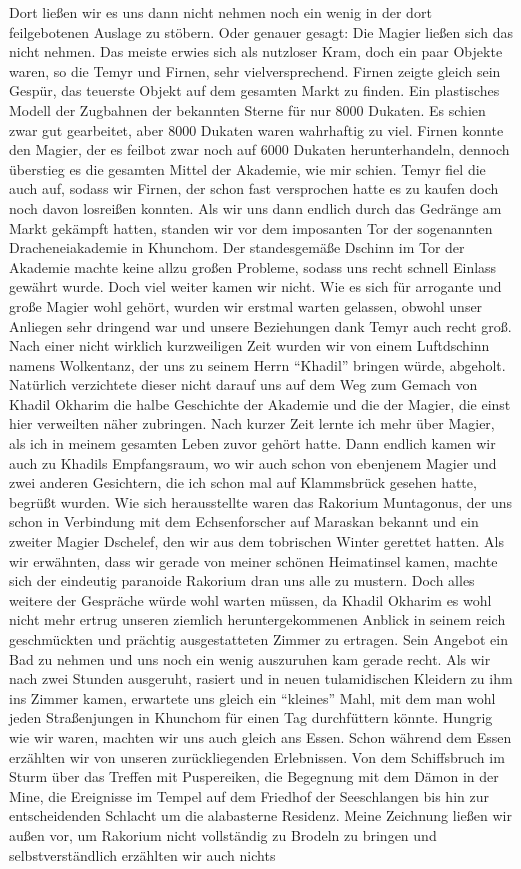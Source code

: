 Dort ließen wir es uns dann nicht nehmen noch ein wenig in der dort feilgebotenen Auslage zu stöbern. Oder genauer gesagt: Die Magier ließen sich das nicht nehmen. Das meiste erwies sich als nutzloser Kram, doch ein paar Objekte waren, so die Temyr und Firnen, sehr vielversprechend. Firnen zeigte gleich sein Gespür, das teuerste Objekt auf dem gesamten Markt zu finden. Ein plastisches Modell der Zugbahnen der bekannten Sterne für nur 8000 Dukaten. Es schien zwar gut gearbeitet, aber 8000 Dukaten waren wahrhaftig zu viel. Firnen konnte den Magier, der es feilbot zwar noch auf 6000 Dukaten herunterhandeln, dennoch überstieg es die gesamten Mittel der Akademie, wie mir schien. Temyr fiel die auch auf, sodass wir Firnen, der schon fast versprochen hatte es zu kaufen doch noch davon losreißen konnten. Als wir uns dann endlich durch das Gedränge am Markt gekämpft hatten, standen wir vor dem imposanten Tor der sogenannten Dracheneiakademie in Khunchom. Der standesgemäße Dschinn im Tor der Akademie machte keine allzu großen Probleme, sodass uns recht schnell Einlass gewährt wurde. Doch viel weiter kamen wir nicht. Wie es sich für arrogante und große Magier wohl gehört, wurden wir erstmal warten gelassen, obwohl unser Anliegen sehr dringend war und unsere Beziehungen dank Temyr auch recht groß. Nach einer nicht wirklich kurzweiligen Zeit wurden wir von einem Luftdschinn namens Wolkentanz, der uns zu seinem Herrn ``Khadil'' bringen würde, abgeholt. Natürlich verzichtete dieser nicht darauf uns auf dem Weg zum Gemach von Khadil Okharim die halbe Geschichte der Akademie und die der Magier, die einst hier verweilten näher zubringen. Nach kurzer Zeit lernte ich mehr über Magier, als ich in meinem gesamten Leben zuvor gehört hatte. Dann endlich kamen wir auch zu Khadils Empfangsraum, wo wir auch schon von ebenjenem Magier und zwei anderen Gesichtern, die ich schon mal auf Klammsbrück gesehen hatte, begrüßt wurden. Wie sich herausstellte waren das Rakorium Muntagonus, der uns schon in Verbindung mit dem Echsenforscher auf Maraskan bekannt und ein zweiter Magier Dschelef, den wir aus dem tobrischen Winter gerettet hatten. Als wir erwähnten, dass wir gerade von meiner schönen Heimatinsel kamen, machte sich der eindeutig paranoide Rakorium dran uns alle zu mustern. Doch alles weitere der Gespräche würde wohl warten müssen, da Khadil Okharim es wohl nicht mehr ertrug unseren ziemlich heruntergekommenen Anblick in seinem reich geschmückten und prächtig ausgestatteten Zimmer zu ertragen. Sein Angebot ein Bad zu nehmen und uns noch ein wenig auszuruhen kam gerade recht. Als wir nach zwei Stunden ausgeruht, rasiert und in neuen tulamidischen Kleidern zu ihm ins Zimmer kamen, erwartete uns gleich ein ``kleines'' Mahl, mit dem man wohl jeden Straßenjungen in Khunchom für einen Tag durchfüttern könnte. Hungrig wie wir waren, machten wir uns auch gleich ans Essen. Schon während dem Essen erzählten wir von unseren zurückliegenden Erlebnissen. Von dem Schiffsbruch im Sturm über das Treffen mit Puspereiken, die Begegnung mit dem Dämon in der Mine, die Ereignisse im Tempel auf dem Friedhof der Seeschlangen bis hin zur entscheidenden Schlacht um die alabasterne Residenz. Meine Zeichnung ließen wir außen vor, um Rakorium nicht vollständig zu Brodeln zu bringen und selbstverständlich erzählten wir auch nichts 